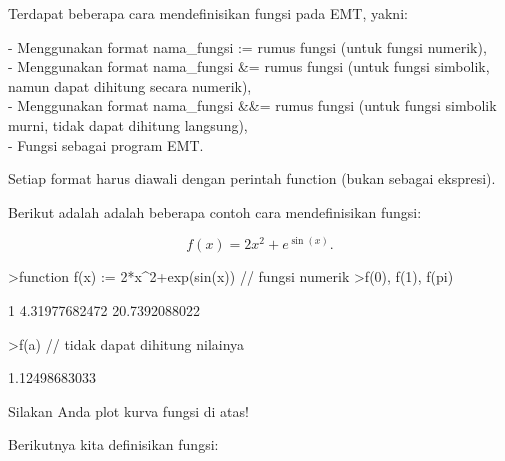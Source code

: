 \documentclass[a4paper,10pt]{article}
\begin{document}
\begin{eulernotebook}
\begin{eulercomment}
\begin{eulercomment}
\begin{eulercomment}
\begin{eulercomment}
\begin{eulercomment}
\begin{eulercomment}
\begin{eulercomment}
\begin{eulercomment}
\begin{eulercomment}
\begin{eulercomment}
\begin{eulercomment}
\begin{eulercomment}
\begin{eulercomment}
\begin{eulercomment}
\begin{eulercomment}
\begin{eulercomment}
\begin{eulercomment}
\begin{eulercomment}
\begin{eulercomment}
\begin{eulercomment}
\begin{eulercomment}
\begin{eulercomment}
\begin{eulercomment}
\begin{eulercomment}
\begin{eulercomment}
\end{eulercomment}
\begin{eulercomment}
Terdapat beberapa cara mendefinisikan fungsi pada EMT, yakni:

- Menggunakan format nama\_fungsi := rumus fungsi (untuk fungsi
numerik),\\
- Menggunakan format nama\_fungsi \&= rumus fungsi (untuk fungsi
simbolik, namun dapat dihitung secara numerik),\\
- Menggunakan format nama\_fungsi \&\&= rumus fungsi (untuk fungsi
simbolik murni, tidak dapat dihitung langsung),\\
- Fungsi sebagai program EMT.

Setiap format harus diawali dengan perintah function (bukan sebagai
ekspresi).

Berikut adalah adalah beberapa contoh cara mendefinisikan fungsi:

\end{eulercomment}
\begin{eulerformula}
\[
f(x)=2x^2+e^{\sin(x)}.
\]
\end{eulerformula}
\begin{eulerprompt}
>function f(x) := 2*x^2+exp(sin(x)) // fungsi numerik
>f(0), f(1), f(pi)
\end{eulerprompt}
\begin{euleroutput}
  1
  4.31977682472
  20.7392088022
\end{euleroutput}
\begin{eulerprompt}
>f(a) // tidak dapat dihitung nilainya
\end{eulerprompt}
\begin{euleroutput}
  1.12498683033
\end{euleroutput}
\begin{eulercomment}
Silakan Anda plot kurva fungsi di atas!

Berikutnya kita definisikan fungsi:


\end{eulercomment}
\end{eulercomment}
\end{eulercomment}
\end{eulercomment}
\end{eulercomment}
\end{eulercomment}
\end{eulercomment}
\end{eulercomment}
\end{eulercomment}
\end{eulercomment}
\end{eulercomment}
\end{eulercomment}
\end{eulercomment}
\end{eulercomment}
\end{eulercomment}
\end{eulercomment}
\end{eulercomment}
\end{eulercomment}
\end{eulercomment}
\end{eulercomment}
\end{eulercomment}
\end{eulercomment}
\end{eulercomment}
\end{eulercomment}
\end{eulercomment}
\end{eulernotebook}
\end{document}
